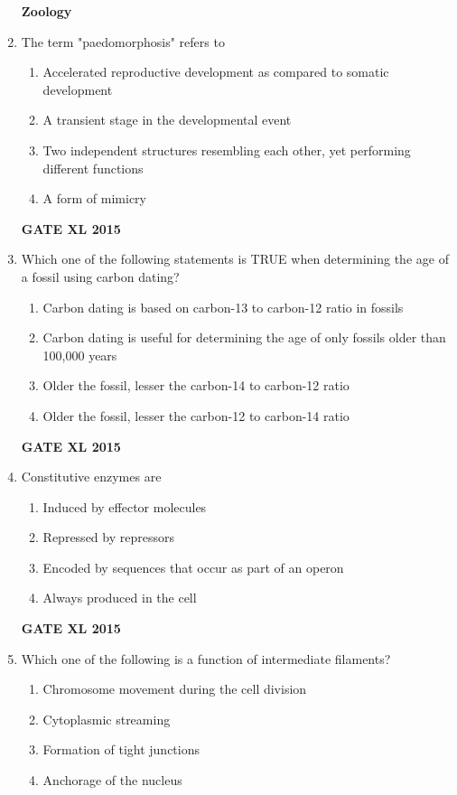 \documentclass[journal,12pt,onecolumn]{IEEEtran}
\begin{document}
\begin{enumerate}
	\textbf{Zoology}
\item  The term "paedomorphosis" refers to
    \begin{enumerate}
            \item Accelerated reproductive development as compared to somatic development
	    \item A transient stage in the developmental event
	    \item  Two independent structures resembling each other, yet performing different functions
            \item A form of mimicry
    \end{enumerate}
\hfill{\textbf{GATE XL 2015}}
\item Which one of the following statements is TRUE when determining the age of a fossil using carbon dating?
    \begin{enumerate}
            \item Carbon dating is based on carbon-13 to carbon-12 ratio in fossils
	    \item Carbon dating is useful for determining the age of only fossils older than 100,000 years
	    \item Older the fossil, lesser the carbon-14 to carbon-12 ratio
            \item Older the fossil, lesser the carbon-12 to carbon-14 ratio
    \end{enumerate}
\hfill{\textbf{GATE XL 2015}}
\item Constitutive enzymes are
    \begin{enumerate}
            \item Induced by effector molecules
	    \item Repressed by repressors
	    \item Encoded by sequences that occur as part of an operon
            \item Always produced in the cell
    \end{enumerate}
\hfill{\textbf{GATE XL 2015}}
\item Which one of the following is a function of intermediate filaments?
    \begin{enumerate}
            \item Chromosome movement during the cell division
	    \item Cytoplasmic streaming
	    \item Formation of tight junctions
            \item Anchorage of the nucleus
    \end{enumerate}

\end{enumerate}
\end{document}
